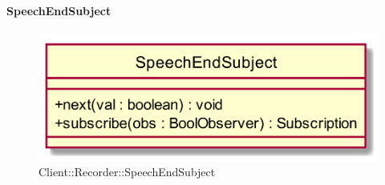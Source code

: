 \hypertarget{SpeechEndSubject_label}{\paragraph{SpeechEndSubject}}
\begin{figure}[h]
	\centering
	\includegraphics[width=\textwidth,height=\textheight,keepaspectratio]{images/ClassSpeechEndSubject.png}
	\caption{Client::Recorder::SpeechEndSubject}
\end{figure}
